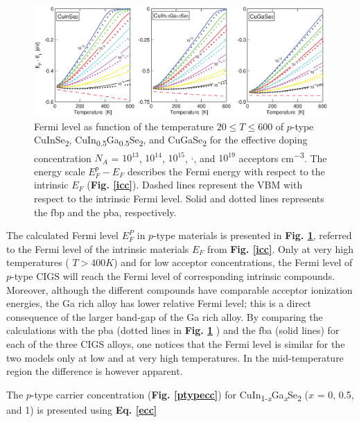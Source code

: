 \documentclass[a4paper, 12pt, titlepage,oneside,drop]{kthesis}
\begin{document}
 \begin{figure}[H]
    \begin{center}
            \includegraphics[width=1\textwidth,clip]{paper2fig8}
     \end{center}
    \caption{Fermi level as function of the temperature $20 \leq T \leq 600$ of $p$-type CuInSe\textsubscript{2}, CuIn\textsubscript{0.5}Ga\textsubscript{0.5}Se\textsubscript{2}, and CuGaSe\textsubscript{2} for the effective
    doping concentration $N_A$ = $10^{13}$, $10^{14}$, $10^{15}$, $\cdot$, and $10^{19}$ acceptors cm\textsuperscript{$-$3}. The energy scale $E_F^p-E_F$ describes the Fermi energy with respect to the intrinsic $E_F$ (\textbf{Fig. \ref{icc}}).
    Dashed lines represent the VBM with respect to the intrinsic Fermi level. Solid and dotted lines represents the fbp and the pba, respectively.}
   \label{ptypecc1}
\end{figure}




The calculated Fermi level $E_F^P$ in $p$-type materials is presented in \textbf{Fig. \ref{ptypecc1}}, referred to the Fermi level of the intrinsic materials $E_F$ from \textbf{Fig. \ref{icc}}. Only at very high temperatures
( $T > 400 K$) and for low acceptor concentrations, the Fermi level of $p$-type CIGS will reach the Fermi level of corresponding intrinsic compounds. Moreover, although the different compounds have comparable acceptor ionization
energies, the Ga rich alloy has lower relative Fermi level; this is a direct consequence of the larger band-gap of the Ga rich alloy. By comparing the calculations with the pba (dotted lines in \textbf{Fig. \ref{ptypecc1}} ) and 
the fba (solid lines) for each of the three CIGS alloys, one notices that the Fermi level is similar for the two models only at low and at very high temperatures. In the mid-temperature region the difference is however apparent.





The $p$-type carrier concentration (\textbf{Fig. \ref{ptypecc}}) for {CuIn\textsubscript{1-\textit{x}}Ga\textsubscript{\textit{x}}Se\textsubscript{2}} ($x$ = 0, 0.5, and 1) is presented using \textbf{Eq. \ref{ecc}}
\end{document}
